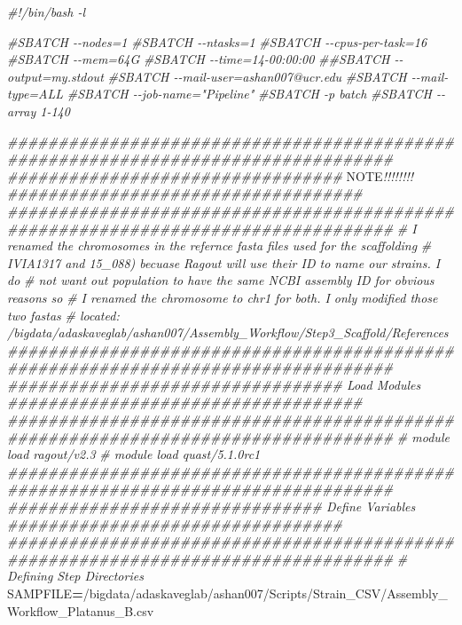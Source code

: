 \documentclass[
]{book}
\newenvironment{Shaded}{\begin{snugshade}}{\end{snugshade}}
\newcommand{\AlertTok}[1]{\textcolor[rgb]{0.94,0.16,0.16}{#1}}
\newcommand{\CommentTok}[1]{\textcolor[rgb]{0.56,0.35,0.01}{\textit{#1}}}
\newcommand{\NormalTok}[1]{#1}
\newcommand{\OperatorTok}[1]{\textcolor[rgb]{0.81,0.36,0.00}{\textbf{#1}}}
\newcommand{\VariableTok}[1]{\textcolor[rgb]{0.00,0.00,0.00}{#1}}
\begin{document}
\begin{Shaded}
\begin{Highlighting}[]
\CommentTok{\#!/bin/bash {-}l}

\CommentTok{\#SBATCH {-}{-}nodes=1}
\CommentTok{\#SBATCH {-}{-}ntasks=1}
\CommentTok{\#SBATCH {-}{-}cpus{-}per{-}task=16}
\CommentTok{\#SBATCH {-}{-}mem=64G}
\CommentTok{\#SBATCH {-}{-}time=14{-}00:00:00}
\CommentTok{\#\#SBATCH {-}{-}output=my.stdout}
\CommentTok{\#SBATCH {-}{-}mail{-}user=ashan007@ucr.edu}
\CommentTok{\#SBATCH {-}{-}mail{-}type=ALL}
\CommentTok{\#SBATCH {-}{-}job{-}name="Pipeline"}
\CommentTok{\#SBATCH {-}p batch}
\CommentTok{\#SBATCH {-}{-}array 1{-}140}

\CommentTok{\#\#\#\#\#\#\#\#\#\#\#\#\#\#\#\#\#\#\#\#\#\#\#\#\#\#\#\#\#\#\#\#\#\#\#\#\#\#\#\#\#\#\#\#\#\#\#\#\#\#\#\#\#\#\#\#\#\#\#\#\#\#\#\#\#\#\#\#\#\#\#\#\#\#\#\#\#\#\#\#\#\#}
\CommentTok{\#\#\#\#\#\#\#\#\#\#\#\#\#\#\#\#\#\#\#\#\#\#\#\#\#\#\#\#\#\#\#\#\# }\AlertTok{NOTE}\CommentTok{!!!!!!!! \#\#\#\#\#\#\#\#\#\#\#\#\#\#\#\#\#\#\#\#\#\#\#\#\#\#\#\#\#\#\#\#\#\#\#}
\CommentTok{\#\#\#\#\#\#\#\#\#\#\#\#\#\#\#\#\#\#\#\#\#\#\#\#\#\#\#\#\#\#\#\#\#\#\#\#\#\#\#\#\#\#\#\#\#\#\#\#\#\#\#\#\#\#\#\#\#\#\#\#\#\#\#\#\#\#\#\#\#\#\#\#\#\#\#\#\#\#\#\#\#\#}
\CommentTok{\# I renamed the chromosomes in the refernce fasta files used for the scaffolding }
\CommentTok{\# IVIA1317 and 15\_088) becuase Ragout will use their ID to name our strains. I do }
\CommentTok{\# not want out population to have the same NCBI assembly ID for obvious reasons so }
\CommentTok{\# I renamed the chromosome to chr1 for both. I only modified those two fastas }
\CommentTok{\# located: /bigdata/adaskaveglab/ashan007/Assembly\_Workflow/Step3\_Scaffold/References}
\CommentTok{\#\#\#\#\#\#\#\#\#\#\#\#\#\#\#\#\#\#\#\#\#\#\#\#\#\#\#\#\#\#\#\#\#\#\#\#\#\#\#\#\#\#\#\#\#\#\#\#\#\#\#\#\#\#\#\#\#\#\#\#\#\#\#\#\#\#\#\#\#\#\#\#\#\#\#\#\#\#\#\#\#\#}
\CommentTok{\#\#\#\#\#\#\#\#\#\#\#\#\#\#\#\#\#\#\#\#\#\#\#\#\#\#\#\#\#\#\#\#\# Load Modules \#\#\#\#\#\#\#\#\#\#\#\#\#\#\#\#\#\#\#\#\#\#\#\#\#\#\#\#\#\#\#\#\#\#\#}
\CommentTok{\#\#\#\#\#\#\#\#\#\#\#\#\#\#\#\#\#\#\#\#\#\#\#\#\#\#\#\#\#\#\#\#\#\#\#\#\#\#\#\#\#\#\#\#\#\#\#\#\#\#\#\#\#\#\#\#\#\#\#\#\#\#\#\#\#\#\#\#\#\#\#\#\#\#\#\#\#\#\#\#\#\#}
\CommentTok{\# module load ragout/v2.3}
\CommentTok{\# module load quast/5.1.0rc1}
\CommentTok{\#\#\#\#\#\#\#\#\#\#\#\#\#\#\#\#\#\#\#\#\#\#\#\#\#\#\#\#\#\#\#\#\#\#\#\#\#\#\#\#\#\#\#\#\#\#\#\#\#\#\#\#\#\#\#\#\#\#\#\#\#\#\#\#\#\#\#\#\#\#\#\#\#\#\#\#\#\#\#\#\#\#}
\CommentTok{\#\#\#\#\#\#\#\#\#\#\#\#\#\#\#\#\#\#\#\#\#\#\#\#\#\#\#\#\#\#\# Define Variables \#\#\#\#\#\#\#\#\#\#\#\#\#\#\#\#\#\#\#\#\#\#\#\#\#\#\#\#\#\#\#\#\#}
\CommentTok{\#\#\#\#\#\#\#\#\#\#\#\#\#\#\#\#\#\#\#\#\#\#\#\#\#\#\#\#\#\#\#\#\#\#\#\#\#\#\#\#\#\#\#\#\#\#\#\#\#\#\#\#\#\#\#\#\#\#\#\#\#\#\#\#\#\#\#\#\#\#\#\#\#\#\#\#\#\#\#\#\#\#}
\CommentTok{\# Defining Step Directories}
\VariableTok{SAMPFILE}\OperatorTok{=}\NormalTok{/bigdata/adaskaveglab/ashan007/Scripts/Strain\_CSV/Assembly\_Workflow\_Platanus\_B.csv}


\end{Highlighting}
\end{Shaded}
\end{document}
